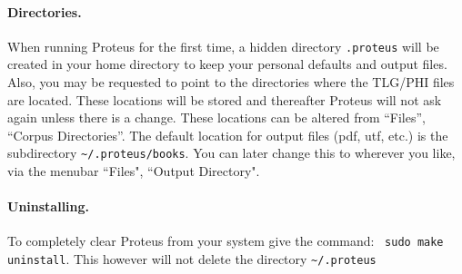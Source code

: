 \documentclass[11pt,a4paper]{article}
\begin{document}
    \paragraph{Directories.}When running Proteus for the first time, a hidden directory {\tt .proteus}
      will be created in your home directory to keep your personal defaults and output files.
      Also, you may be requested to point to the directories where the TLG/PHI
      files are located. These locations will be stored and thereafter
      Proteus will not ask again unless there is a change.
      These locations can be altered from ``Files'', ``Corpus Directories''.
      The default location for output files (pdf, utf, etc.) is the
      subdirectory {\tt \~{}/.proteus/books}.  You can later change this
      to wherever you like, via the menubar ``Files", ``Output Directory".
    \paragraph{Uninstalling.}
      To completely clear Proteus from your system give the command:~
      {\tt sudo make uninstall}.  This however will not
      delete the directory {\tt \~{}/.proteus}
  \newpage
\end{document}
